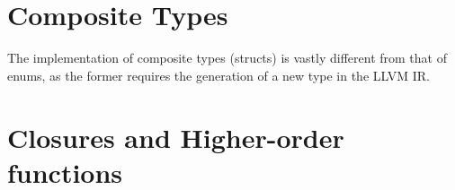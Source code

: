 \section{Composite Types}

The implementation of composite types (structs) is vastly different from that of enums, as the
former requires the generation of a new type in the LLVM IR.


\section{Closures and Higher-order functions}
